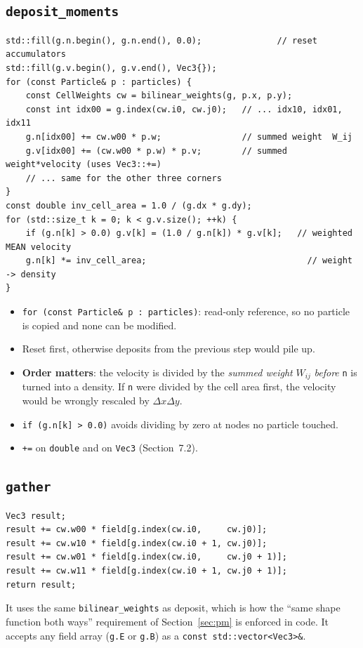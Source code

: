 \documentclass[11pt,a4paper]{article}
\begin{document}
\subsection{\texttt{deposit\_moments}}
\begin{lstlisting}
std::fill(g.n.begin(), g.n.end(), 0.0);               // reset accumulators
std::fill(g.v.begin(), g.v.end(), Vec3{});
for (const Particle& p : particles) {
    const CellWeights cw = bilinear_weights(g, p.x, p.y);
    const int idx00 = g.index(cw.i0, cw.j0);   // ... idx10, idx01, idx11
    g.n[idx00] += cw.w00 * p.w;                // summed weight  W_ij
    g.v[idx00] += (cw.w00 * p.w) * p.v;        // summed weight*velocity (uses Vec3::+=)
    // ... same for the other three corners
}
const double inv_cell_area = 1.0 / (g.dx * g.dy);
for (std::size_t k = 0; k < g.v.size(); ++k) {
    if (g.n[k] > 0.0) g.v[k] = (1.0 / g.n[k]) * g.v[k];   // weighted MEAN velocity
    g.n[k] *= inv_cell_area;                                // weight -> density
}
\end{lstlisting}
\begin{itemize}
  \item \lstinline|for (const Particle& p : particles)|: read-only reference, so no particle is copied and none
        can be modified.
  \item Reset first, otherwise deposits from the previous step would pile up.
  \item \textbf{Order matters}: the velocity is divided by the \emph{summed weight} $W_{ij}$ \emph{before}
        \texttt{n} is turned into a density. If \texttt{n} were divided by the cell area first, the velocity would be
        wrongly rescaled by $\Delta x\Delta y$.
  \item \lstinline|if (g.n[k] > 0.0)| avoids dividing by zero at nodes no particle touched.
  \item \lstinline|+=| on \texttt{double} and on \texttt{Vec3} (Section~7.2).
\end{itemize}

\subsection{\texttt{gather}}
\begin{lstlisting}
Vec3 result;
result += cw.w00 * field[g.index(cw.i0,     cw.j0)];
result += cw.w10 * field[g.index(cw.i0 + 1, cw.j0)];
result += cw.w01 * field[g.index(cw.i0,     cw.j0 + 1)];
result += cw.w11 * field[g.index(cw.i0 + 1, cw.j0 + 1)];
return result;
\end{lstlisting}
It uses the same \texttt{bilinear\_weights} as deposit, which is how the ``same shape function both ways''
requirement of Section~\ref{sec:pm} is enforced in code. It accepts any field array (\texttt{g.E} or
\texttt{g.B}) as a \lstinline|const std::vector<Vec3>&|.
\end{document}
